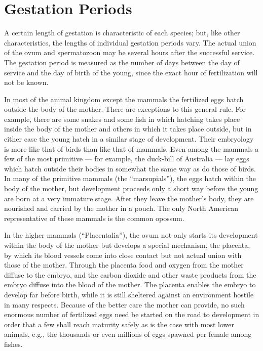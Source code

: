 \chapter{Gestation Periods}
\label{cha:Lush_Chapter_36}

A certain length of gestation is characteristic of each species; but,
like other characteristics, the lengths of individual gestation periods
vary. The actual union of the ovum and spermatozoon may be several
hours after the successful service. The gestation period is measured as
the number of days between the day of service and the day of birth of
the young, since the exact hour of fertilization will not be known.

In most of the animal kingdom except the mammals the fertilized
eggs hatch outside the body of the mother. There are exceptions to this
general rule. For example, there are some snakes and some fish in which
hatching takes place inside the body of the mother and others in which
it takes place outside, but in either case the young hatch in a similar
stage of development. Their embryology is more like that of birds than
like that of mammals. Even among the mammals a few of the most
primitive --- for example, the duck-bill of Australia --- lay eggs which
hatch outside their bodies in somewhat the same way as do those of
birds. In many of the primitive mammals (the ``marsupials''), the eggs
hatch within the body of the mother, but development proceeds only a
short way before the young are born at a very immature stage. After
they leave the mother's body, they are nourished and carried by the
mother in a pouch. The only North American representative of these
mammals is the common opossum.

In the higher mammals (``Placentalia''), the ovum not only starts its
development within the body of the mother but develops a special
mechanism, the placenta, by which its blood vessels come into close contact
but not actual union with those of the mother. Through the placenta
food and oxygen from the mother diffuse to the embryo, and the
carbon dioxide and other waste products from the embryo diffuse into
the blood of the mother. The placenta enables the embryo to develop
far before birth, while it is still sheltered against an environment hostile
in many respects. Because of the better care the mother can provide,
no such enormous number of fertilized eggs need be started on the road
to development in order that a few shall reach maturity safely as is the
case with most lower animals, e.g., the thousands or even millions of
eggs spawned per female among fishes.
\noclub[3]

